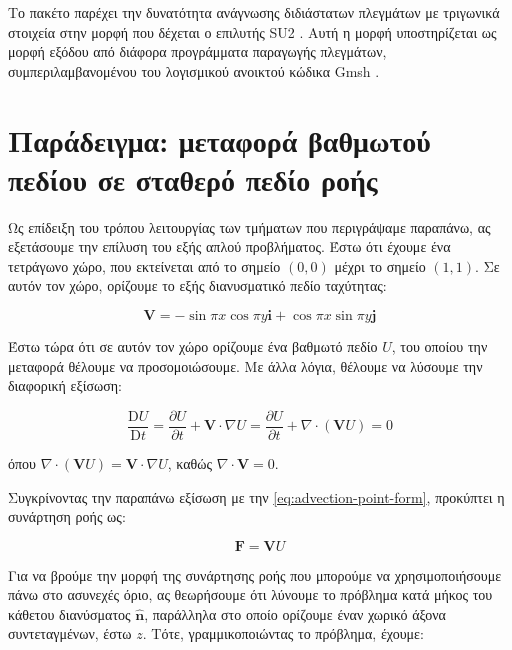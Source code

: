 Το πακέτο παρέχει την δυνατότητα ανάγνωσης διδιάστατων πλεγμάτων με τριγωνικά στοιχεία στην μορφή που δέχεται ο επιλυτής SU2 \cite{Palacios2013}.
Αυτή η μορφή υποστηρίζεται ως μορφή εξόδου από διάφορα προγράμματα παραγωγής πλεγμάτων, συμπεριλαμβανομένου του λογισμικού ανοικτού κώδικα Gmsh \cite{Gmsh2009}.

\section{Παράδειγμα: μεταφορά βαθμωτού πεδίου σε σταθερό πεδίο ροής}

Ως επίδειξη του τρόπου λειτουργίας των τμήματων που περιγράψαμε παραπάνω, ας εξετάσουμε την επίλυση του εξής απλού προβλήματος.
Έστω ότι έχουμε ένα τετράγωνο χώρο, που εκτείνεται από το σημείο $\left(0, 0\right)$ μέχρι το σημείο $\left(1, 1\right)$.
Σε αυτόν τον χώρο, ορίζουμε το εξής διανυσματικό πεδίο ταχύτητας:

\begin{equation*}
    \mathbf{V} = - \sin \pi x \cos \pi y \mathbf{i} + \cos \pi x \sin \pi y \mathbf{j}
\end{equation*}


Έστω τώρα ότι σε αυτόν τον χώρο ορίζουμε ένα βαθμωτό πεδίο $U$, του οποίου την μεταφορά θέλουμε να προσομοιώσουμε.
Με άλλα λόγια, θέλουμε να λύσουμε την διαφορική εξίσωση:

\begin{equation*}
    \frac{\mathrm{D} U}{\mathrm{D} t} = \frac{\partial U}{\partial t} + \mathbf{V} \cdot \nabla U =
        \frac{\partial U}{\partial t} + \nabla \cdot \left( \mathbf{V} U \right) = 0
\end{equation*}

όπου $\nabla \cdot \left( \mathbf{V} U \right) = \mathbf{V} \cdot \nabla U$, καθώς $\nabla \cdot \mathbf{V} = 0$.

Συγκρίνοντας την παραπάνω εξίσωση με την \ref{eq:advection-point-form}, προκύπτει η συνάρτηση ροής ως:

\begin{equation*}
    \mathbf{F} = \mathbf{V} U
\end{equation*}

Για να βρούμε την μορφή της συνάρτησης ροής που μπορούμε να χρησιμοποιήσουμε πάνω στο ασυνεχές όριο, ας θεωρήσουμε ότι λύνουμε το πρόβλημα κατά μήκος του κάθετου διανύσματος $\mathbf{\hat{n}}$, παράλληλα στο οποίο ορίζουμε έναν χωρικό άξονα συντεταγμένων, έστω $z$.
Τότε, γραμμικοποιώντας το πρόβλημα, έχουμε:

